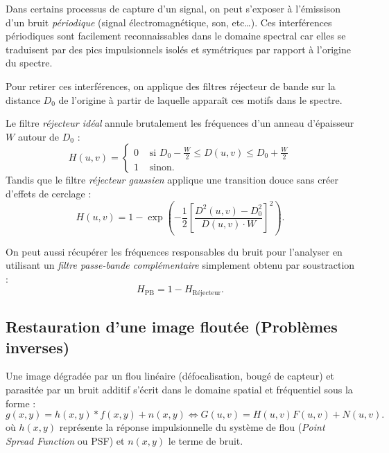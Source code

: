 Dans certains processus de capture d'un signal, on peut s'exposer à l'émissison d'un bruit \emph{périodique} (signal électromagnétique, son, etc\dots). Ces interférences périodiques sont facilement reconnaissables dans le domaine spectral car elles se traduisent par des pics impulsionnels isolés et symétriques par rapport à l'origine du spectre. 

Pour retirer ces interférences, on applique des filtres réjecteur de bande sur la distance $D_0$ de l'origine à partir de laquelle apparaît ces motifs dans le spectre. 

\begin{proposition}
    Le filtre \emph{réjecteur idéal} annule brutalement les fréquences d'un anneau d'épaisseur $W$ autour de $D_0$ : 
    \begin{equation}
        H(u,v) = 
        \begin{cases}
            0 & \text{ si } D_0 - \frac{W}{2} \leqslant D(u,v) \leqslant D_0 + \frac{W}{2} \\ 
            1 & \text{ sinon}. 
        \end{cases}
    \end{equation}
    Tandis que le filtre \emph{réjecteur gaussien} applique une transition douce sans créer d'effets de cerclage : 
    \begin{equation}
        H(u,v) = 1 - \exp \left( - \frac{1}{2} \left[ \frac{D^2(u,v) - D_0^2}{D(u,v) \cdot W} \right]^2 \right). 
    \end{equation}
\end{proposition}

\begin{remark}
    On peut aussi récupérer les fréquences responsables du bruit pour l'analyser en utilisant un \emph{filtre passe-bande complémentaire} simplement obtenu par soustraction : 
    \begin{equation}
        H_{\text{PB}} = 1 - H_{\text{Réjecteur}}.
    \end{equation}
\end{remark}

\subsection{Restauration d'une image floutée (Problèmes inverses)}

Une image dégradée par un flou linéaire (défocalisation, bougé de capteur) et parasitée par un bruit additif s'écrit dans le domaine spatial et fréquentiel sous la forme :
\begin{equation}
    g(x,y) = h(x,y) * f(x,y) + n(x,y) \iff G(u,v) = H(u,v) F(u,v) + N(u,v).
\end{equation}
où $h(x,y)$ représente la réponse impulsionnelle du système de flou (\emph{Point Spread Function} ou PSF) et $n(x,y)$ le terme de bruit. 

